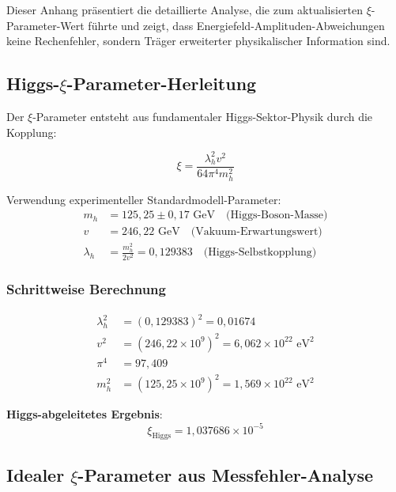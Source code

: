 \documentclass[12pt,a4paper]{article}
\begin{document}
	Dieser Anhang präsentiert die detaillierte Analyse, die zum aktualisierten $\xi$-Parameter-Wert führte und zeigt, dass Energiefeld-Amplituden-Abweichungen keine Rechenfehler, sondern Träger erweiterter physikalischer Information sind.
	
	\subsection{Higgs-$\xi$-Parameter-Herleitung}
	
	Der $\xi$-Parameter entsteht aus fundamentaler Higgs-Sektor-Physik durch die Kopplung:
	
	\begin{equation}
		\xi = \frac{\lambda_h^2 v^2}{64\pi^4 m_h^2}
		\label{eq:higgs_xi_appendix}
	\end{equation}
	
	Verwendung experimenteller Standardmodell-Parameter:
	\begin{align}
		m_h &= 125,25 \pm 0,17 \text{ GeV} \quad \text{(Higgs-Boson-Masse)} \\
		v &= 246,22 \text{ GeV} \quad \text{(Vakuum-Erwartungswert)} \\
		\lambda_h &= \frac{m_h^2}{2v^2} = 0,129383 \quad \text{(Higgs-Selbstkopplung)}
	\end{align}
	
	\subsubsection{Schrittweise Berechnung}
	
	\begin{align}
		\lambda_h^2 &= (0,129383)^2 = 0,01674 \\
		v^2 &= (246,22 \times 10^9)^2 = 6,062 \times 10^{22} \text{ eV}^2 \\
		\pi^4 &= 97,409 \\
		m_h^2 &= (125,25 \times 10^9)^2 = 1,569 \times 10^{22} \text{ eV}^2
	\end{align}
	
	\textbf{Higgs-abgeleitetes Ergebnis}:
	\begin{equation}
		\xi_{\text{Higgs}} = 1,037686 \times 10^{-5}
	\end{equation}
	
	\subsection{Idealer $\xi$-Parameter aus Messfehler-Analyse}
	
\end{document}

